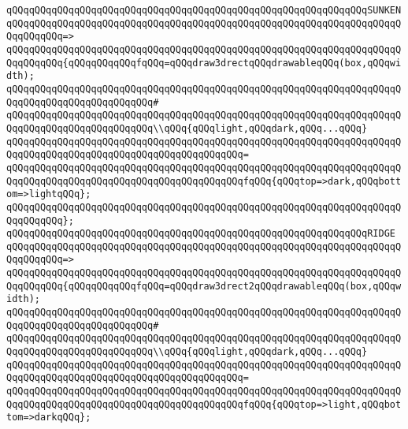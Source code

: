 \newline
\verb|qQQqqQQqqQQqqQQqqQQqqQQqqQQqqQQqqQQqqQQqqQQqqQQqqQQqqQQqqQQqqQQqSUNKEN|\newline
\verb|qQQqqQQqqQQqqQQqqQQqqQQqqQQqqQQqqQQqqQQqqQQqqQQqqQQqqQQqqQQqqQQqqQQqqQQqqQQqqQQq=>|\newline
\verb|qQQqqQQqqQQqqQQqqQQqqQQqqQQqqQQqqQQqqQQqqQQqqQQqqQQqqQQqqQQqqQQqqQQqqQQqqQQqqQQq{qQQqqQQqqQQqfqQQq=qQQqdraw3drectqQQqdrawableqQQq(box,qQQqwidth);|\newline
\verb|qQQqqQQqqQQqqQQqqQQqqQQqqQQqqQQqqQQqqQQqqQQqqQQqqQQqqQQqqQQqqQQqqQQqqQQqqQQqqQQqqQQqqQQqqQQqqQQq#|\newline
\verb|qQQqqQQqqQQqqQQqqQQqqQQqqQQqqQQqqQQqqQQqqQQqqQQqqQQqqQQqqQQqqQQqqQQqqQQqqQQqqQQqqQQqqQQqqQQqqQQq\\qQQq{qQQqlight,qQQqdark,qQQq...qQQq}|\newline
\verb|qQQqqQQqqQQqqQQqqQQqqQQqqQQqqQQqqQQqqQQqqQQqqQQqqQQqqQQqqQQqqQQqqQQqqQQqqQQqqQQqqQQqqQQqqQQqqQQqqQQqqQQqqQQqqQQq=|\newline
\verb|qQQqqQQqqQQqqQQqqQQqqQQqqQQqqQQqqQQqqQQqqQQqqQQqqQQqqQQqqQQqqQQqqQQqqQQqqQQqqQQqqQQqqQQqqQQqqQQqqQQqqQQqqQQqqQQqfqQQq{qQQqtop=>dark,qQQqbottom=>lightqQQq};|\newline
\verb|qQQqqQQqqQQqqQQqqQQqqQQqqQQqqQQqqQQqqQQqqQQqqQQqqQQqqQQqqQQqqQQqqQQqqQQqqQQqqQQq};|\newline
\newline
\verb|qQQqqQQqqQQqqQQqqQQqqQQqqQQqqQQqqQQqqQQqqQQqqQQqqQQqqQQqqQQqqQQqRIDGE|\newline
\verb|qQQqqQQqqQQqqQQqqQQqqQQqqQQqqQQqqQQqqQQqqQQqqQQqqQQqqQQqqQQqqQQqqQQqqQQqqQQqqQQq=>|\newline
\verb|qQQqqQQqqQQqqQQqqQQqqQQqqQQqqQQqqQQqqQQqqQQqqQQqqQQqqQQqqQQqqQQqqQQqqQQqqQQqqQQq{qQQqqQQqqQQqfqQQq=qQQqdraw3drect2qQQqdrawableqQQq(box,qQQqwidth);|\newline
\verb|qQQqqQQqqQQqqQQqqQQqqQQqqQQqqQQqqQQqqQQqqQQqqQQqqQQqqQQqqQQqqQQqqQQqqQQqqQQqqQQqqQQqqQQqqQQqqQQq#|\newline
\verb|qQQqqQQqqQQqqQQqqQQqqQQqqQQqqQQqqQQqqQQqqQQqqQQqqQQqqQQqqQQqqQQqqQQqqQQqqQQqqQQqqQQqqQQqqQQqqQQq\\qQQq{qQQqlight,qQQqdark,qQQq...qQQq}|\newline
\verb|qQQqqQQqqQQqqQQqqQQqqQQqqQQqqQQqqQQqqQQqqQQqqQQqqQQqqQQqqQQqqQQqqQQqqQQqqQQqqQQqqQQqqQQqqQQqqQQqqQQqqQQqqQQqqQQq=|\newline
\verb|qQQqqQQqqQQqqQQqqQQqqQQqqQQqqQQqqQQqqQQqqQQqqQQqqQQqqQQqqQQqqQQqqQQqqQQqqQQqqQQqqQQqqQQqqQQqqQQqqQQqqQQqqQQqqQQqfqQQq{qQQqtop=>light,qQQqbottom=>darkqQQq};|\newline
